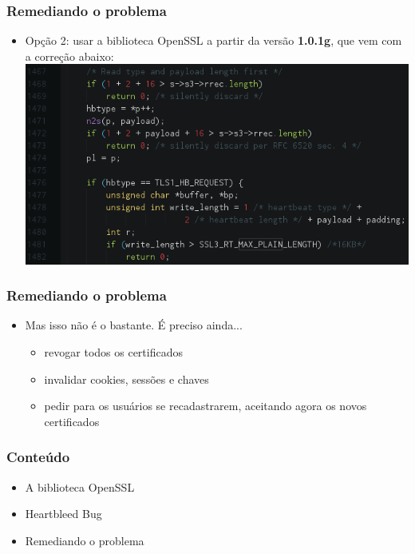 \documentclass{beamer}
\begin{document}
\begin{frame}
	\frametitle{Remediando o problema}
	\begin{itemize}
		\item Opção 2: usar a biblioteca OpenSSL a partir da versão \textbf{1.0.1g}, que vem com a correção abaixo: \\
		\includegraphics[scale=0.45]{05_correcao.png}
	\end{itemize}
\end{frame}

\begin{frame}
	\frametitle{Remediando o problema}
		\begin{itemize}
			\item Mas isso não é o bastante. É preciso ainda...
			\begin{itemize}
				\item revogar todos os certificados
				\item invalidar cookies, sessões e chaves
				\item pedir para os usuários se recadastrarem, aceitando agora os novos certificados 
			\end{itemize}
			
		\end{itemize}
\end{frame}

\begin{frame}
	\frametitle{Conteúdo}
	\begin{itemize}
		\item \textcolor{covered}{A biblioteca OpenSSL}
		\item \textcolor{covered}{Heartbleed Bug}
		\item \textcolor{covered}{Remediando o problema}
	\end{itemize}
\end{frame}
\end{document}
